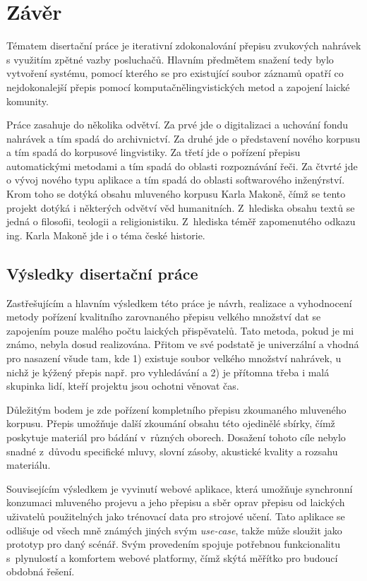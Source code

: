 \chapter{Závěr}
\label{kap:zaver}

Tématem disertační práce je iterativní zdokonalování přepisu zvukových
nahrávek s využitím zpětné vazby posluchačů. Hlavním předmětem snažení
tedy bylo vytvoření systému, pomocí kterého se pro existující soubor
záznamů opatří co nejdokonalejší přepis pomocí komputačnělingvistických metod a
zapojení laické komunity.

Práce zasahuje do několika odvětví.
Za prvé jde o digitalizaci a uchování fondu nahrávek a tím spadá do
archivnictví.
Za druhé jde o představení nového korpusu a tím spadá do korpusové lingvistiky.
Za třetí jde o pořízení přepisu automatickými metodami a tím spadá do oblasti
rozpoznávání řeči.
Za čtvrté jde o vývoj nového typu aplikace a tím spadá do oblasti
softwarového inženýrství.
Krom toho se dotýká obsahu
mluveného korpusu Karla Makoně, čímž se tento projekt dotýká i některých
odvětví věd humanitních. Z~hlediska obsahu textů se jedná o filosofii, teologii
a religionistiku. Z~hlediska téměř zapomenutého odkazu ing. Karla Makoně jde i o
téma české historie.

\section{Výsledky disertační práce}
\label{sec:zaver:vysledky}

Zastřešujícím a hlavním výsledkem této práce je návrh, realizace a vyhodnocení
metody pořízení kvalitního zarovnaného přepisu velkého množství dat se zapojením
pouze malého počtu laických přispěvatelů. Tato metoda, pokud je mi známo, nebyla
dosud realizována. Přitom ve své podstatě je univerzální a vhodná pro nasazení
všude tam, kde 1) existuje soubor velkého množství nahrávek, u nichž je kýžený
přepis např. pro vyhledávání a 2) je přítomna třeba i malá skupinka lidí, kteří
projektu jsou ochotni věnovat čas.

Důležitým bodem je zde pořízení kompletního přepisu zkoumaného mluveného
korpusu. Přepis umožňuje další zkoumání obsahu této ojedinělé sbírky, čímž
poskytuje materiál pro bádání v~různých oborech. Dosažení tohoto cíle nebylo snadné z~důvodu specifické mluvy,
slovní zásoby, akustické kvality a rozsahu materiálu.

Souvisejícím výsledkem je vyvinutí webové aplikace, která umožňuje
synchronní konzumaci mluveného projevu a jeho přepisu
a sběr oprav přepisu od laických uživatelů použitelných jako trénovací data
pro strojové učení.
Tato aplikace se odlišuje od všech mně známých jiných svým \textit{use-case},
takže může sloužit jako prototyp pro daný scénář.
Svým provedením spojuje potřebnou funkcionalitu s~plynulostí a komfortem
webové platformy, čímž skýtá měřítko pro budoucí obdobná řešení.

